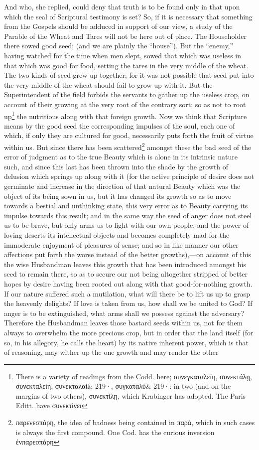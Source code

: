 And who, she replied, could deny that truth is to be found only in that upon which the seal of Scriptural testimony is set? So, if it is necessary that something from the Gospels should be adduced in support of our view, a study of the Parable of the Wheat and Tares will not be here out of place. The Householder there sowed good seed; (and we are plainly the “house”). But the “enemy,” having watched for the time when men slept, sowed that which was useless in that which was good for food, setting the tares in the very middle of the wheat. The two kinds of seed grew up together; for it was not possible that seed put into the very middle of the wheat should fail to grow up with it. But the Superintendent of the field forbids the servants to gather up the useless crop, on account of their growing at the very root of the contrary sort; so as not to root up\footnote{There is a variety of readings from the Codd. here; \textgreek{συνεγκαταλείη, συνεκτάλῃ, συνεκταλείη, συνεκταλαί\& 219·, συγκαταλύ\& 219·}: in two (and on the margins of two others), \textgreek{συνεκτίλῃ}, which Krabinger has adopted. The Paris Editt. have \textgreek{συνεκτίνει}} the nutritious along with that foreign growth. Now we think that Scripture means by the good seed the corresponding impulses of the soul, each one of which, if only they are cultured for good, necessarily puts forth the fruit of virtue within us. But since there has been scattered\footnote{\textgreek{παρενεσπάρη}, the idea of badness being contained in \textgreek{παρὰ}, which in such cases is always the first compound. One Cod. has the curious inversion \textgreek{ἐνπαρεσπάρη}} amongst these the bad seed of the error of judgment as to the true Beauty which is alone in its intrinsic nature such, and since this last has been thrown into the shade by the growth of delusion which springs up along with it (for the active principle of desire does not germinate and increase in the direction of that natural Beauty which was the object of its being sown in us, but it has changed its growth so as to move towards a bestial and unthinking state, this very error as to Beauty carrying its impulse towards this result; and in the same way the seed of anger does not steel us to be brave, but only arms us to fight with our own people; and the power of loving deserts its intellectual objects and becomes completely mad for the immoderate enjoyment of pleasures of sense; and so in like manner our other affections put forth the worse instead of the better growths),—on account of this the wise Husbandman leaves this growth that has been introduced amongst his seed to remain there, so as to secure our not being altogether stripped of better hopes by desire having been rooted out along with that good-for-nothing growth. If our nature suffered such a mutilation, what will there be to lift us up to grasp the heavenly delights? If love is taken from us, how shall we be united to God? If anger is to be extinguished, what arms shall we possess against the adversary? Therefore the Husbandman leaves those bastard seeds within us, not for them always to overwhelm the more precious crop, but in order that the land itself (for so, in his allegory, he calls the heart) by its native inherent power, which is that of reasoning, may wither up the one growth and may render the other 